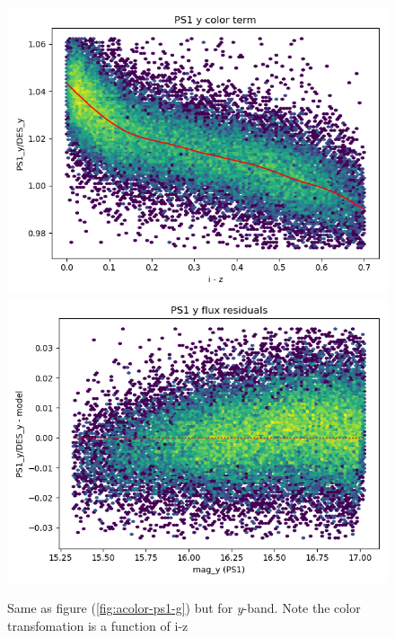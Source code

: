 \begin{figure}
    \includegraphics[width=0.49\linewidth]{./figures/color_terms/PS1_to_DES_band_y_color_term.png}
    \includegraphics[width=0.49\linewidth]{./figures/color_terms/PS1_to_DES_band_y_flux_residuals.png}
    \caption{Same as figure (\ref{fig:acolor-ps1-g}) but for \textit{y}-band. Note the color transfomation is a function of i-z}
\end{figure}

\clearpage
